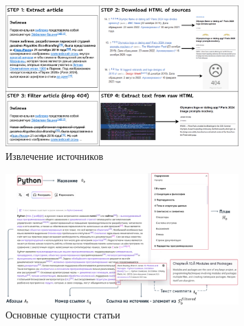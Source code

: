 \documentclass{article}
\begin{document}
\begin{figure}[ht!]
  \centering
  \includegraphics[width=0.8\textwidth]{figures/Source_extract.png}
  \caption{Извлечение источников}
  \label{fig:source}
\end{figure}

\begin{figure}[ht!]
  \centering
  \includegraphics[width=0.8\textwidth]{figures/article_entities.png}
  \caption{Основные сущности статьи}
  \label{fig:article}
\end{figure}
\end{document}
